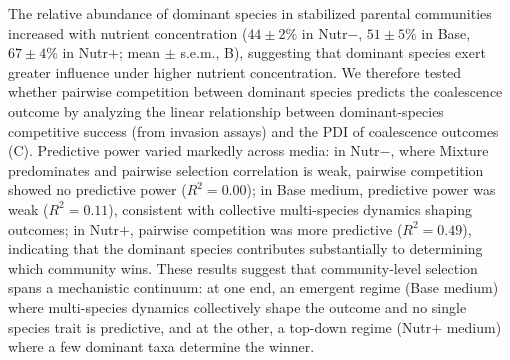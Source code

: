 The relative abundance of dominant species in stabilized parental communities increased with nutrient concentration ($44 \pm 2\%$ in Nutr$-$, $51 \pm 5\%$ in Base, $67 \pm 4\%$ in Nutr$+$; mean $\pm$ s.e.m., B), suggesting that dominant species exert greater influence under higher nutrient concentration. We therefore tested whether pairwise competition between dominant species predicts the coalescence outcome by analyzing the linear relationship between dominant-species competitive success (from invasion assays) and the PDI of coalescence outcomes (C). Predictive power varied markedly across media: in Nutr$-$, where Mixture predominates and pairwise selection correlation is weak, pairwise competition showed no predictive power ($R^2 = 0.00$); in Base medium, predictive power was weak ($R^2 = 0.11$), consistent with collective multi-species dynamics shaping outcomes; in Nutr$+$, pairwise competition was more predictive ($R^2 = 0.49$), indicating that the dominant species contributes substantially to determining which community wins. These results suggest that community-level selection spans a mechanistic continuum: at one end, an emergent regime (Base medium) where multi-species dynamics collectively shape the outcome and no single species trait is predictive, and at the other, a top-down regime (Nutr$+$ medium) where a few dominant taxa determine the winner.


